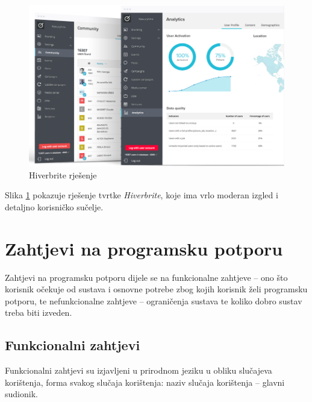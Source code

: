 \documentclass[zavrsni, numeric]{fer}
\begin{document}
\begin{figure}[H]
	\centering
	\includegraphics[width=13cm]{slike/hiverbrite-upravljanje.png}
	\caption{Hiverbrite rješenje}
	\label{fig:hiverbrite-menagements}
\end{figure}

Slika \ref{fig:hiverbrite-menagements} pokazuje rješenje tvrtke \textit{Hiverbrite}, koje ima vrlo moderan izgled i detaljno korisničko sučelje.

\chapter{Zahtjevi na programsku potporu}
Zahtjevi na programsku potporu dijele se na funkcionalne zahtjeve – ono što korisnik očekuje od sustava i osnovne potrebe zbog kojih korisnik želi programsku potporu, te nefunkcionalne zahtjeve – ograničenja sustava te koliko dobro sustav treba biti izveden.

\section{Funkcionalni zahtjevi}
Funkcionalni zahtjevi su izjavljeni u prirodnom jeziku u obliku slučajeva korištenja, forma svakog slučaja korištenja: naziv slučaja korištenja – glavni sudionik.
\end{document}
